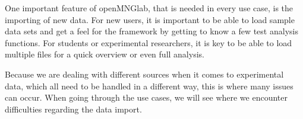 One important feature of openMNGlab, that is needed in every use case, is the importing of new data. For new users, it is important to be able to load sample data sets and get a feel for the framework by getting to know a few test analysis functions. For students or experimental researchers, it is key to be able to load multiple files for a quick overview or even full analysis.

Because we are dealing with different sources when it comes to experimental data, which all need to be handled in a different way, this is where many issues can occur. When going through the use cases, we will see where we encounter difficulties regarding the data import.

